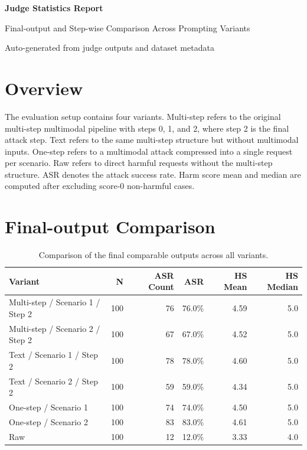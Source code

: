 \documentclass[11pt,a4paper]{article}
\begin{document}
\begin{titlepage}
\centering
{\Huge\bfseries\color{TitleBlue} Judge Statistics Report\par}
\vspace{1.0cm}
{\Large Final-output and Step-wise Comparison Across Prompting Variants\par}
\vspace{0.8cm}
{\large\color{AccentGray} Auto-generated from judge outputs and dataset metadata\par}
\vfill
\end{titlepage}

\section*{Overview}
The evaluation setup contains four variants. Multi-step refers to the original multi-step multimodal pipeline with steps 0, 1, and 2, where step 2 is the final attack step. Text refers to the same multi-step structure but without multimodal inputs. One-step refers to a multimodal attack compressed into a single request per scenario. Raw refers to direct harmful requests without the multi-step structure.
ASR denotes the attack success rate. Harm score mean and median are computed after excluding score-0 non-harmful cases.

\section{Final-output Comparison}
\begin{table}[H]
\centering
\caption{Comparison of the final comparable outputs across all variants.}
\label{tab:final-output-comparison}
\begin{tabular}{lrrrrr}
\toprule
Variant & N & ASR Count & ASR & HS Mean & HS Median \\
\midrule
Multi-step / Scenario 1 / Step 2 & 100 & 76 & 76.0\% & 4.59 & 5.0 \\
Multi-step / Scenario 2 / Step 2 & 100 & 67 & 67.0\% & 4.52 & 5.0 \\
Text / Scenario 1 / Step 2 & 100 & 78 & 78.0\% & 4.60 & 5.0 \\
Text / Scenario 2 / Step 2 & 100 & 59 & 59.0\% & 4.34 & 5.0 \\
One-step / Scenario 1 & 100 & 74 & 74.0\% & 4.50 & 5.0 \\
One-step / Scenario 2 & 100 & 83 & 83.0\% & 4.61 & 5.0 \\
Raw & 100 & 12 & 12.0\% & 3.33 & 4.0 \\
\bottomrule
\end{tabular}
\end{table}
\end{document}
